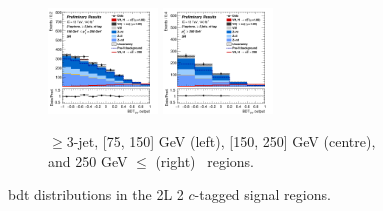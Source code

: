 \begin{figure}[h!]
\begin{subfigure}[b]{\textwidth}
        \includegraphics[width=0.32\textwidth]{Images/VH/Own_fit/postfit_VHcc/Region_distmva_BMax250_BMin150_DSR_J3_TTypext_incJet1_T2_L2_Y6051_GlobalFit_conditionnal_mu1.png}
        \includegraphics[width=0.32\textwidth]{Images/VH/Own_fit/postfit_VHcc/Region_distmva_BMin250_DSR_J3_TTypext_incJet1_T2_L2_Y6051_GlobalFit_conditionnal_mu1.png}
        \caption{$\geq$3-jet, [75, 150] GeV (left), [150, 250] GeV (centre), and 250  GeV $\leq$ (right) \ptv\ regions.}
        \label{fig:plots_VHcc_2L_SR_2c_3J}
    \end{subfigure}
    \caption{\gls{bdt} distributions in the 2L 2 $c$-tagged signal regions.}
    \label{fig:plots_VHcc_2L_SR_2c}
\end{figure}
